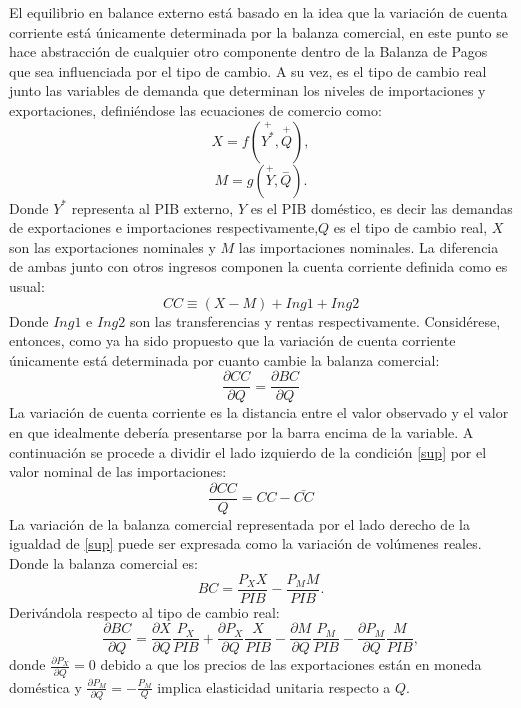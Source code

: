 \documentclass[12pt,letterpaper]{article}
\begin{document}
El equilibrio en balance externo está basado en la idea que la variación de cuenta corriente está únicamente determinada por la balanza comercial, en este punto se hace abstracción de cualquier otro componente dentro de la Balanza de Pagos que sea influenciada por el tipo de cambio. A su vez, es el tipo de cambio real junto las variables de demanda que determinan los niveles de importaciones y exportaciones, definiéndose las ecuaciones de comercio como:
\begin{equation}\label{X}
X=f(\overset{+}{Y^*},\overset{+}{Q}),
\end{equation}
\begin{equation}\label{M}
M=g(\overset{+}{Y},\overset{-}{Q}).
\end{equation}
Donde $Y^*$ representa al PIB externo, $Y$ es el PIB doméstico, es decir las demandas de exportaciones e importaciones respectivamente,$Q$ es el tipo de cambio real, $X$ son las exportaciones nominales y $M$ las importaciones nominales.
La diferencia de ambas junto con otros ingresos componen la cuenta corriente definida como es usual:
\begin{equation}\label{CC}
CC\equiv(X-M)+Ing1+Ing2
\end{equation}
Donde $Ing1$ e $Ing2$ son las transferencias y rentas respectivamente.
Considérese, entonces, como ya ha sido propuesto que la variación de cuenta corriente únicamente está determinada por cuanto cambie la balanza comercial:
\begin{equation}\label{sup}
\frac{\partial CC}{\partial Q}=\frac{\partial BC}{\partial Q}
\end{equation}
La variación de cuenta corriente es la distancia entre el valor observado y el valor en que idealmente debería presentarse por la barra encima de la variable. A continuación se procede a dividir el lado izquierdo de la condición \ref{sup} por el valor nominal de las importaciones:
\begin{equation}\label{dcc}
\frac{\partial CC}{Q}=CC-\bar{CC}
\end{equation}
La variación de la balanza comercial representada por el lado derecho de la igualdad de \ref{sup} puede ser expresada como la variación de volúmenes reales. Donde la balanza comercial es:
\begin{equation}
BC=\frac{P_X X}{PIB}-\frac{P_M M}{PIB}.
\end{equation}
Derivándola respecto al tipo de cambio real:
\begin{equation}
\frac{\partial BC}{\partial Q}=\frac{\partial X}{\partial Q} \frac{P_X}{PIB}+\frac{\partial P_X}{\partial Q} \frac{X}{PIB} - \frac{\partial M}{\partial Q} \frac{P_M}{PIB}-\frac{\partial P_M}{\partial Q}\frac{M}{PIB},
\end{equation}
donde $\frac{\partial P_X}{\partial Q}=0$ debido a que los precios de las exportaciones están en moneda doméstica y $\frac{\partial P_M}{\partial Q}=-\frac{P_M}{Q}$ implica elasticidad unitaria respecto a $Q$.
\end{document}
